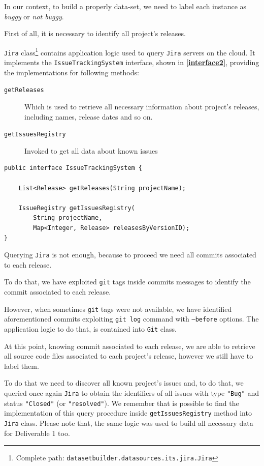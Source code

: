 \documentclass[sigconf]{acmart}
\begin{document}
In our context, to build a properly data-set, we need to label each instance as \textit{buggy} or \textit{not buggy}. 

First of all, it is necessary to identify all project's releases. 

\texttt{Jira} class\footnote{Complete path: \texttt{datasetbuilder.datasources.its.jira.Jira}} contains application logic used to query \texttt{Jira} servers on the cloud. It implements the \texttt{Issue\-Tracking\-System} interface, shown in \textbf{\cref{interface2}}, providing the implementations for following methods:

\begin{description}
\item[\texttt{getReleases}] Which is used to retrieve all necessary information about project's releases, including names, release dates and so on.
\item[\texttt{getIssuesRegistry}] Invoked to get all data about known issues 
\end{description}

\begin{lstlisting}[frame=lines,basicstyle=\ttfamily\scriptsize, caption={\texttt{IssueTrackingSystem} interface}, label={interface2}]
public interface IssueTrackingSystem {

    List<Release> getReleases(String projectName);

    IssueRegistry getIssuesRegistry(
    	String projectName, 
    	Map<Integer, Release> releasesByVersionID);
}
\end{lstlisting}

Querying \texttt{Jira} is not enough, because to proceed we need all commits associated to each release.

To do that, we have exploited \texttt{git} tags inside commits messages to identify the commit associated to each release. 

However, when sometimes \texttt{git} tags were not available, we have identified aforementioned commits exploiting \texttt{git\- log} command with \texttt{--before\- [date]} options. The application logic to do that, is contained into \texttt{Git} class.

At this point, knowing commit associated to each release, we are able to retrieve all source code files associated to each project's release, however we still have to label them.

To do that we need to discover all known project's issues and, to do that, we queried once again \texttt{Jira} to obtain the identifiers of all issues with type \texttt{"Bug"} and status \texttt{"Closed"} (or \texttt{"resolved"}). We remember that is possible to find the implementation of this query procedure inside \texttt{get\-Issues\-Registry} method into \texttt{Jira} class. Please note that, the same logic was used to build all necessary data for Deliverable 1 too.
\end{document}
